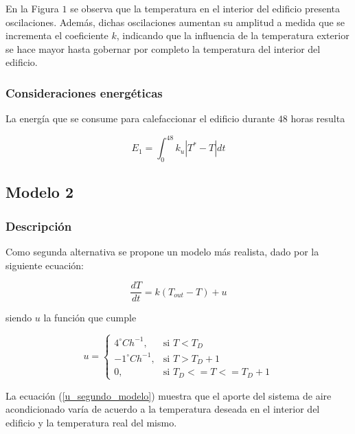\documentclass{sig-alternate}
\begin{document}
En la Figura $1$ se observa que la temperatura en 
el interior del edificio presenta oscilaciones. Adem\'{a}s, dichas oscilaciones
aumentan su amplitud a medida que se incrementa el coeficiente $k$, indicando
que la influencia de la temperatura exterior se hace mayor hasta
gobernar por completo la temperatura del interior del edificio.

\subsubsection{Consideraciones energ\'{e}ticas}

La energ\'{i}a que se consume para calefaccionar el edificio durante $48$
horas resulta

\begin{equation}
\label{energia_primer_modelo}
E_{1} = \int_{0}^{48} k_{u} | T^{*} - T | dt
\end{equation}


\subsection{Modelo 2}

\subsubsection{Descripci\'{o}n}

Como segunda alternativa se propone un modelo m\'{a}s realista, dado por la
siguiente ecuaci\'{o}n:

\begin{equation}
\label{segundo_modelo}
\frac{dT}{dt} = k ( T_{out} - T ) + u
\end{equation}

siendo $u$ la funci\'{o}n que cumple

\begin{equation}
\label{u_segundo_modelo}
u =  \begin{cases} 4^{\circ} C h^{-1}, & \mbox{si }  T < T_{D} \\
-1^{\circ} C h^{-1}, & \mbox{si }  T > T_{D} + 1 \\
0, & \mbox{si }  T_{D} <= T <= T_{D}+1 \end{cases}
\end{equation}

La ecuaci\'{o}n (\ref{u_segundo_modelo}) muestra que el aporte del
sistema de aire acondicionado var\'{i}a de acuerdo a la temperatura
deseada en el interior del edificio y la temperatura real del mismo.
\end{document}
